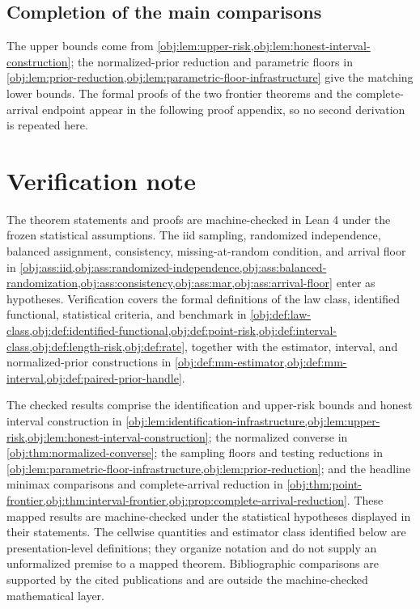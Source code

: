 \documentclass[11pt]{article}
\begin{document}
\subsection{Completion of the main comparisons}

The upper bounds come from \cref{obj:lem:upper-risk,obj:lem:honest-interval-construction}; the normalized-prior reduction and parametric floors in \cref{obj:lem:prior-reduction,obj:lem:parametric-floor-infrastructure} give the matching lower bounds. The formal proofs of the two frontier theorems and the complete-arrival endpoint appear in the following proof appendix, so no second derivation is repeated here.


\section{Verification note}

The theorem statements and proofs are machine-checked in Lean 4 under the frozen statistical assumptions. The iid sampling, randomized independence, balanced assignment, consistency, missing-at-random condition, and arrival floor in \cref{obj:ass:iid,obj:ass:randomized-independence,obj:ass:balanced-randomization,obj:ass:consistency,obj:ass:mar,obj:ass:arrival-floor} enter as hypotheses. Verification covers the formal definitions of the law class, identified functional, statistical criteria, and benchmark in \cref{obj:def:law-class,obj:def:identified-functional,obj:def:point-risk,obj:def:interval-class,obj:def:length-risk,obj:def:rate}, together with the estimator, interval, and normalized-prior constructions in \cref{obj:def:mm-estimator,obj:def:mm-interval,obj:def:paired-prior-handle}.

The checked results comprise the identification and upper-risk bounds and honest interval construction in \cref{obj:lem:identification-infrastructure,obj:lem:upper-risk,obj:lem:honest-interval-construction}; the normalized converse in \cref{obj:thm:normalized-converse}; the sampling floors and testing reductions in \cref{obj:lem:parametric-floor-infrastructure,obj:lem:prior-reduction}; and the headline minimax comparisons and complete-arrival reduction in \cref{obj:thm:point-frontier,obj:thm:interval-frontier,obj:prop:complete-arrival-reduction}. These mapped results are machine-checked under the statistical hypotheses displayed in their statements. The cellwise quantities and estimator class identified below are presentation-level definitions; they organize notation and do not supply an unformalized premise to a mapped theorem. Bibliographic comparisons are supported by the cited publications and are outside the machine-checked mathematical layer.
\end{document}
